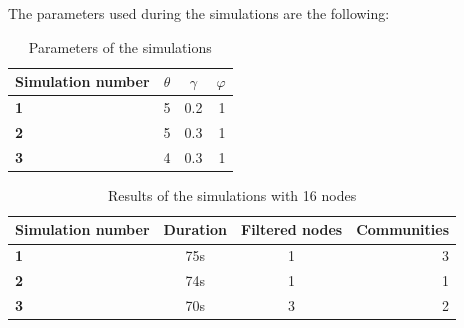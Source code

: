 \documentclass[12pt]{article}
\begin{document}
The parameters used during the simulations are the following:
\begin{table}[tbhp]
    \centering
    \begin{tabu}{|l|c|c|r|}
        \hline
        Simulation number & $\theta$ & $\gamma$  & $\varphi$  \\ \hline
        \textbf{1}    & 5  & 0.2  & 1   \\ \hline
        \textbf{2}    & 5  & 0.3  & 1   \\ \hline
        \textbf{3}    & 4  & 0.3  & 1   \\ \hline


  \end{tabu}                                                                                        \label{tab:parameters1}
    \caption[A Table]{Parameters of the simulations}
\end{table}
\newpage
\begin{table}[H]
    \centering
    \begin{tabu}{|l|c|c|r|}
        \hline
        Simulation number & Duration & Filtered nodes  & Communities  \\ \hline
        \textbf{1}    & 75s  & 1  & 3   \\ \hline
        \textbf{2}    & 74s  & 1  & 1   \\ \hline
        \textbf{3}    & 70s  & 3  & 2   \\ \hline  \end{tabu}
    \caption{Results of the simulations with 16 nodes}
    \label{tab:result1}
\end{table}
\end{document}
